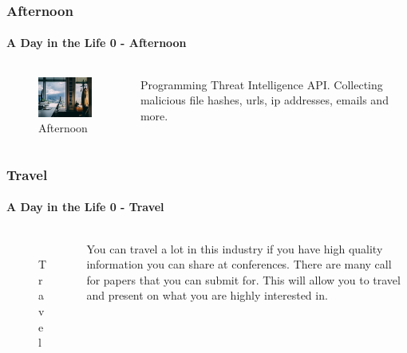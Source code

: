 \documentclass[aspectratio=169]{beamer}
\begin{document}
\begin{frame}
  \frametitle{Afternoon}
  \framesubtitle{A Day in the Life 0 - Afternoon}
  \begin{columns}[onlytextwidth]
    \begin{column}{.30\textwidth}
      \begin{figure}
        \includegraphics[width=5.5cm,keepaspectratio]{afternoon}
        \caption{Afternoon}
      \end{figure}
    \end{column}
    \hfill
    \begin{column}{.60\textwidth}
        \begin{tcolorbox}[title=programming.log,colback=gray]
         Programming Threat Intelligence API. Collecting malicious file hashes, urls, ip addresses, emails and more. 
        \end{tcolorbox}
    \end{column}
  \end{columns}
\end{frame}

\begin{frame}
  \frametitle{Travel}
  \framesubtitle{A Day in the Life 0 - Travel}
  \begin{columns}[onlytextwidth]
    \begin{column}{.30\textwidth}
      \begin{figure}
        \includegraphics[width=5.5cm,keepaspectratio]{travel}
        \caption{Travel}
      \end{figure}
    \end{column}
    \hfill
    \begin{column}{.60\textwidth}
        \begin{tcolorbox}[title=travel.log,colback=gray]
          You can travel a lot in this industry if you have high quality information you can share at conferences. There are many call for papers that you can submit for. This will allow you to travel and present on what you are highly interested in.
        \end{tcolorbox}
    \end{column}
  \end{columns}
\end{frame}
\end{document}
